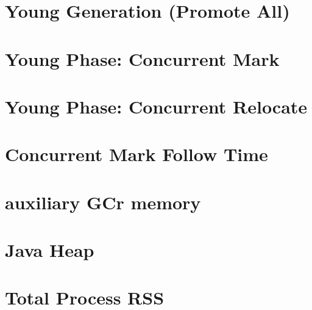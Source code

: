 

\section{Young Generation (Promote All)}
\label{app:stats-younggen}



\section{Young Phase: Concurrent Mark}
\label{app:stats-young-mark}



\section{Young Phase: Concurrent Relocate}
\label{app:stats-young-relocate}



\section{Concurrent Mark Follow Time}
\label{app:stats-markfollow}



\section{auxiliary GCr memory}
\label{app:stats-mem-aux}



\section{Java Heap}
\label{app:stats-mem-heap}



\section{Total Process RSS}
\label{app:stats-mem-rss}

